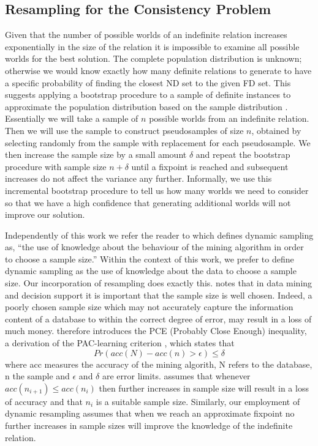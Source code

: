 \subsection{Resampling for the Consistency Problem}

Given that the number of  possible worlds of an indefinite relation increases
exponentially in the size of the relation  it is impossible to
examine all possible worlds for the best solution.  The
complete population distribution is unknown; otherwise we would know 
exactly how many definite relations to
generate to have a specific probability of finding the closest ND set
to the given FD set.  This suggests 
applying a bootstrap procedure to a sample of definite instances 
to approximate the population distribution based on the sample
distribution \cite{et86}.  Essentially we will take a sample of
$n$ possible
worlds from an indefinite relation. Then we will use the sample
to construct pseudosamples of size $n$, obtained by selecting
randomly from the sample with replacement for each pseudosample. 
We then increase the sample size by a small amount $\delta$ and repeat
the bootstrap procedure with sample size $n + \delta$ until a fixpoint
is reached and subsequent increases do not affect the variance any further.
Informally, we use this incremental
bootstrap procedure to tell us how many worlds we need 
to consider so that we have a high confidence that generating additional
worlds will not improve our solution.

\medskip

Independently of this work we refer the reader to \cite{jl96} which
defines dynamic sampling as, ``the use of knowledge about the
behaviour of the mining algorithm in order to choose a sample size.''
Within the context of this work, we prefer to define dynamic sampling
as the use of knowledge about the data to choose a sample size. Our
incorporation of resampling does exactly this.
\cite{jl96} notes that in data mining and decision support it is
important that the sample size is well chosen.  Indeed, a poorly
chosen sample size which may not accurately capture the information
content of a database to within the correct degree of error, may
result in a loss of much money. \cite{jl96} therefore introduces the
PCE (Probably Close Enough) inequality, a derivation of the
PAC-learning criterion \cite{val84,ab92}, which states that
\[
Pr(acc(N) - acc(n) > \epsilon) \le \delta
\]
where acc measures the accuracy of the mining algorith, N refers to
the database, n the sample and $\epsilon$ and $\delta$ are error
limits. \cite{jl96} assumes that whenever $acc(n_{i+1}) \le acc(n_i)$
then further increases in sample size will result in a loss of
accuracy and that $n_i$ is a suitable sample size. Similarly, our
employment of dynamic resampling assumes that when we reach an
approximate fixpoint no further increases in sample sizes will improve
the knowledge of the indefinite relation. 

